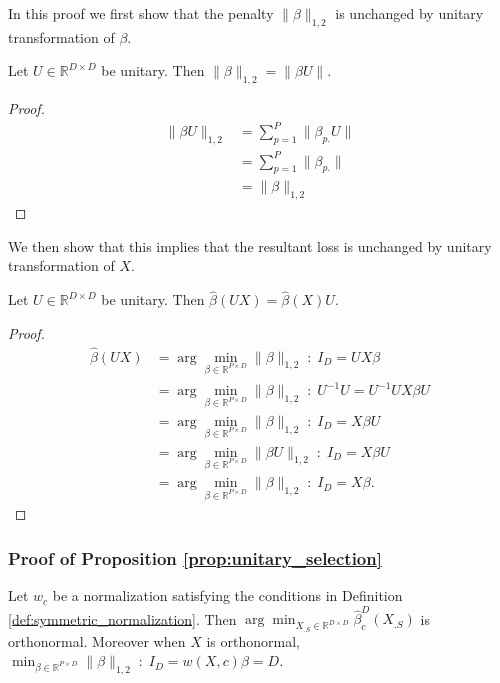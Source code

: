 In this proof we first show that the penalty $\|\beta\|_{1,2}$ is unchanged by unitary transformation of $\beta$.

 \begin{proposition}
 \label{prop:basis_pursuit_loss_equivalence}
 Let $U \in \mathbb R^{D \times D}$ be unitary.
 Then $\|\beta\|_{1,2} = \|\beta U \|$.
\end{proposition}

\begin{proof}
\begin{align}
\|\beta U \|_{1,2} &= \sum_{p = 1}^P \| \beta_{p.} U \| \\
&= \sum_{p = 1}^P \| \beta_{p.} \| \\
&= \|\beta \|_{1,2}
\end{align}
\end{proof}

We then show that this implies that the resultant loss is unchanged by unitary transformation of $ X$.

\begin{proposition}
 \label{prop:basis_pursuit_loss_equivalence}
 Let $U \in \mathbb R^{D \times D}$ be unitary.
 Then $\widehat \beta  (U  X) = \widehat \beta  (  X) U$.
\end{proposition}

\begin{proof}
\begin{align}
\widehat \beta  (U  X)  &= \arg \min_{\beta \in \mathbb R^{P \times D}} \|\beta\|_{1,2}  \; : \; I_{D} = U X \beta \\
&= \arg \min_{\beta \in \mathbb R^{P \times D}} \|\beta\|_{1,2}  \; : \; U^{-1} U = U^{-1} U X \beta U \\
&= \arg \min_{\beta \in \mathbb R^{P \times D}} \|\beta\|_{1,2}  \; : \;  I_D = X \beta U \\
&= \arg \min_{\beta \in \mathbb R^{P \times D}} \|\beta U \|_{1,2}  \; : \;  I_D = X \beta U \\
&= \arg \min_{\beta \in \mathbb R^{P \times D}} \|\beta \|_{1,2}  \; : \;  I_D = X \beta.
\end{align}
\end{proof}


\subsubsection{Proof of Proposition \ref{prop:unitary_selection}}
\label{sec:local_isometry_proof}

 \begin{proposition}
\label{prop:generalized_unitary_selection}
Let $w_c$ be a normalization satisfying the conditions in Definition \ref{def:symmetric_normalization}.  Then $\arg \min_{X_{.S} \in \mathbb R^{D \times D}} \widehat \beta^{D}_c (X_{.S}) $ is orthonormal.  Moreover when $X$ is orthonormal, $\min_{\beta \in \mathbb R^{P \times D}} \| \beta \|_{1,2} \; : \; I_D = w (  X, c) \beta = D$.
 \end{proposition}
 

